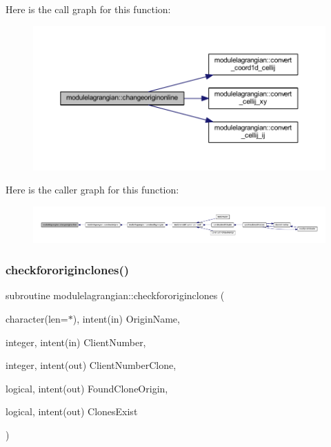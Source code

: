 Here is the call graph for this function\+:\nopagebreak
\begin{figure}[H]
\begin{center}
\leavevmode
\includegraphics[width=350pt]{namespacemodulelagrangian_abfb29437c427b37d5253837c1d2b738e_cgraph}
\end{center}
\end{figure}
Here is the caller graph for this function\+:\nopagebreak
\begin{figure}[H]
\begin{center}
\leavevmode
\includegraphics[width=350pt]{namespacemodulelagrangian_abfb29437c427b37d5253837c1d2b738e_icgraph}
\end{center}
\end{figure}
\mbox{\label{namespacemodulelagrangian_a80725dbaa881f5358592ca2d92316001}} 
\subsubsection{\texorpdfstring{checkfororiginclones()}{checkfororiginclones()}}
{\footnotesize\ttfamily subroutine modulelagrangian\+::checkfororiginclones (\begin{DoxyParamCaption}\item[{character(len=$\ast$), intent(in)}]{Origin\+Name,  }\item[{integer, intent(in)}]{Client\+Number,  }\item[{integer, intent(out)}]{Client\+Number\+Clone,  }\item[{logical, intent(out)}]{Found\+Clone\+Origin,  }\item[{logical, intent(out)}]{Clones\+Exist }\end{DoxyParamCaption})\hspace{0.3cm}{\ttfamily [private]}}

